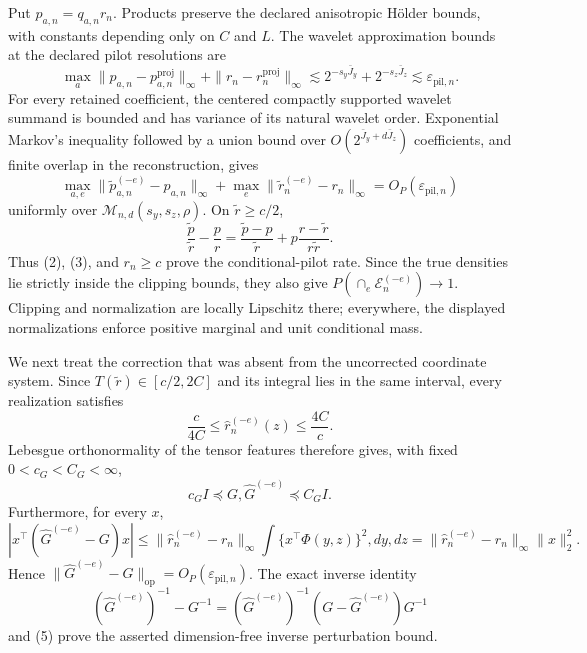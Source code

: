 Put \(p_{a,n}=q_{a,n}r_n\).  Products preserve the declared anisotropic H\"older bounds, with constants depending only on \(C\) and \(L\).  The wavelet approximation bounds at the declared pilot resolutions are
\[
\max_a\|p_{a,n}-p_{a,n}^{\mathrm{proj}}\|_\infty
+\|r_n-r_n^{\mathrm{proj}}\|_\infty
\lesssim2^{-s_y\bar J_y}+2^{-s_z\bar J_z}\lesssim\varepsilon_{\mathrm{pil},n}. \tag{1}
\]
For every retained coefficient, the centered compactly supported wavelet summand is bounded and has variance of its natural wavelet order.  Exponential Markov's inequality followed by a union bound over \(O(2^{\bar J_y+d\bar J_z})\) coefficients, and finite overlap in the reconstruction, gives
\[
\max_{a,e}\|\widetilde p_{a,n}^{(-e)}-p_{a,n}\|_\infty
+\max_e\|\widetilde r_n^{(-e)}-r_n\|_\infty
=O_P(\varepsilon_{\mathrm{pil},n})                                      \tag{2}
\]
uniformly over \(\mathcal M_{n,d}(s_y,s_z,\rho)\).  On \(\widetilde r\ge c/2\),
\[
\frac{\widetilde p}{\widetilde r}-\frac p r
=\frac{\widetilde p-p}{\widetilde r}
+p\frac{r-\widetilde r}{r\widetilde r}.                                \tag{3}
\]
Thus (2), (3), and \(r_n\ge c\) prove the conditional-pilot rate.  Since the true densities lie strictly inside the clipping bounds, they also give \(P(\cap_e\mathcal E_n^{(-e)})\to1\).  Clipping and normalization are locally Lipschitz there; everywhere, the displayed normalizations enforce positive marginal and unit conditional mass.

We next treat the correction that was absent from the uncorrected coordinate system.  Since \(T(\widetilde r)\in[c/2,2C]\) and its integral lies in the same interval, every realization satisfies
\[
\frac{c}{4C}\le\widehat r_n^{(-e)}(z)\le\frac{4C}{c}.                   \tag{4}
\]
Lebesgue orthonormality of the tensor features therefore gives, with fixed \(0<c_G<C_G<\infty\),
\[
c_GI\preceq G,\widehat G^{(-e)}\preceq C_GI.                             \tag{5}
\]
Furthermore, for every \(x\),
\[
|x^{\top}(\widehat G^{(-e)}-G)x|
\le\|\widehat r_n^{(-e)}-r_n\|_\infty
\int\{x^{\top}\Phi(y,z)\}^2,dy,dz
=\|\widehat r_n^{(-e)}-r_n\|_\infty\|x\|_2^2.                         \tag{6}
\]
Hence \(\|\widehat G^{(-e)}-G\|_{\mathrm{op}}=O_P(\varepsilon_{\mathrm{pil},n})\).  The exact inverse identity
\[
(\widehat G^{(-e)})^{-1}-G^{-1}
=(\widehat G^{(-e)})^{-1}(G-\widehat G^{(-e)})G^{-1}                    \tag{7}
\]
and (5) prove the asserted dimension-free inverse perturbation bound.

